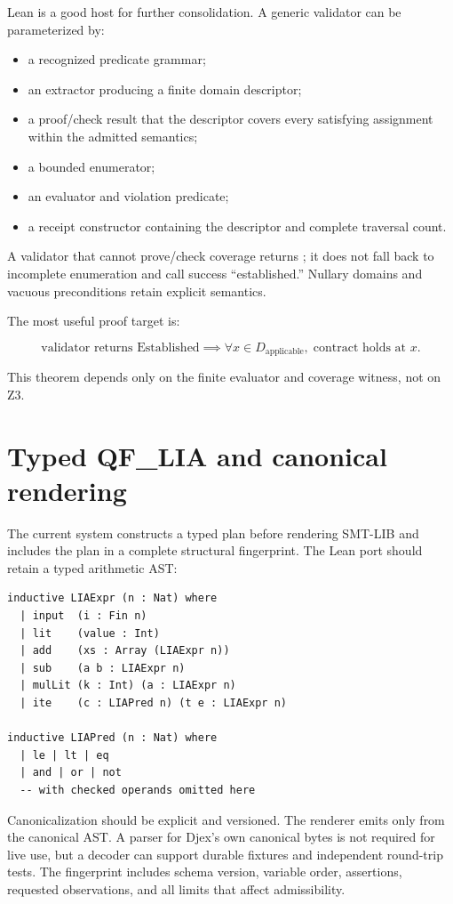 \documentclass[10pt,letterpaper,oneside]{report}
\newcommand{\code}[1]{\texttt{\detokenize{#1}}}
\begin{document}
Lean is a good host for further consolidation. A generic validator can be parameterized by:

\begin{itemize}
  \item a recognized predicate grammar;
  \item an extractor producing a finite domain descriptor;
  \item a proof/check result that the descriptor covers every satisfying assignment within the admitted semantics;
  \item a bounded enumerator;
  \item an evaluator and violation predicate;
  \item a receipt constructor containing the descriptor and complete traversal count.
\end{itemize}

A validator that cannot prove/check coverage returns \code{inapplicable}; it does not fall back to incomplete enumeration and call success ``established.'' Nullary domains and vacuous preconditions retain explicit semantics.

The most useful proof target is:

\[
\text{validator returns Established}
\implies
\forall x \in D_{\text{applicable}},\; \text{contract holds at }x.
\]

This theorem depends only on the finite evaluator and coverage witness, not on Z3.

\section{Typed QF\_LIA and canonical rendering}

The current system constructs a typed plan before rendering SMT-LIB and includes the plan in a complete structural fingerprint. The Lean port should retain a typed arithmetic AST:

\begin{lstlisting}[language=Leanish]
inductive LIAExpr (n : Nat) where
  | input  (i : Fin n)
  | lit    (value : Int)
  | add    (xs : Array (LIAExpr n))
  | sub    (a b : LIAExpr n)
  | mulLit (k : Int) (a : LIAExpr n)
  | ite    (c : LIAPred n) (t e : LIAExpr n)

inductive LIAPred (n : Nat) where
  | le | lt | eq
  | and | or | not
  -- with checked operands omitted here
\end{lstlisting}

Canonicalization should be explicit and versioned. The renderer emits only from the canonical AST. A parser for Djex's own canonical bytes is not required for live use, but a decoder can support durable fixtures and independent round-trip tests. The fingerprint includes schema version, variable order, assertions, requested observations, and all limits that affect admissibility.
\end{document}
